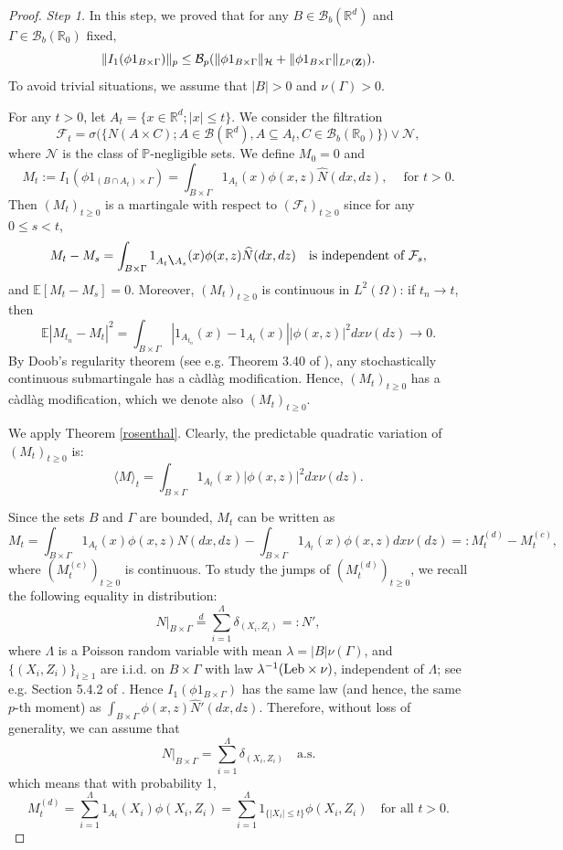 \documentclass[12pt]{article}
\def\cB{\mathcal{B}}
\def\cF{\mathcal{F}}
\def\cH{\mathcal{H}}
\def\cN{\mathcal{N}}
\def\bE{\mathbb{E}}
\def\bP{\mathbb{P}}
\def\bR{\mathbb{R}}
\begin{document}
\begin{proof}
{\em Step 1.} In this step, we proved that for any $B \in \cB_b(\bR^d)$ and $\Gamma \in \cB_b(\bR_0)$ fixed,
\begin{equation}
\label{mom-I2}
\|I_1(\phi 1_{B \times \Gamma})\|_p \leq \cB_p (\|\phi 1_{B \times \Gamma}\|_{\cH}+\|\phi 1_{B \times \Gamma}\|_{L^p({\bf Z})}).
\end{equation}
To avoid trivial situations, we assume that $|B|>0$ and $\nu(\Gamma)>0$.

For any $t>0$, let $A_t=\{x \in \bR^d;|x|\leq t\}$. We consider the filtration
\[
\cF_t=\sigma\big(\big\{N(A \times C); A \in \cB(\bR^d),A \subseteq A_t, C \in \cB_b(\bR_0)\big\}\big) \vee \cN,
\]
where $\cN$ is the class of $\bP$-negligible sets. We define $M_0=0$ and
\[
M_t:=I_1(\phi 1_{(B \cap A_t)\times \Gamma} )=\int_{B \times \Gamma} 1_{A_t}(x)\phi(x,z)\widehat{N}(dx,dz), \quad \ \mbox{for $t>0$}.
\]
Then $(M_t)_{t\geq 0}$ is a martingale with respect to $(\cF_t)_{t\geq 0}$ since for any $0\leq s<t$,
\[
M_t-M_s=\int_{B \times \Gamma} 1_{A_t\verb2\2 A_s}(x)\phi(x,z)\widehat{N}(dx,dz) \quad \mbox{is independent of $\cF_s$},
\]
and $\bE[M_t-M_s]=0$. Moreover, $(M_t)_{t\geq 0}$ is continuous in $L^2(\Omega)$: if $t_n \to t$, then
\[
\bE|M_{t_n}-M_t|^2 =\int_{B \times \Gamma} |1_{A_{t_n}} (x)-1_{A_t}(x)| |\phi(x,z)|^2 dx\nu(dz) \to 0.
\]
By Doob's regularity theorem (see e.g. Theorem 3.40 of \cite{PZ07}), any stochastically continuous submartingale has a c\`adl\`ag modification. Hence, $(M_t)_{t\geq 0}$ has a c\`adl\`ag modification, which we denote also $(M_t)_{t\geq 0}$. 

We apply Theorem \ref{rosenthal}. Clearly, the predictable quadratic variation of $(M_t)_{t\geq 0}$ is:
\[
\langle M\rangle_t=\int_{B \times \Gamma}1_{A_t}(x)|\phi(x,z)|^2 dx \nu(dz).
\]

Since the sets $B$ and $\Gamma$ are bounded, $M_t$ can be written as
\[
M_t=\int_{B \times \Gamma}1_{A_t}(x)\phi(x,z)N(dx,dz)-\int_{B \times \Gamma}1_{A_t}(x)\phi(x,z)dx\nu(dz)=:M_t^{(d)}-M_t^{(c)},
\]
where $(M_t^{(c)})_{t\geq 0}$ is continuous. To study the jumps of $(M_t^{(d)})_{t\geq 0}$, we recall the following equality in distribution:
\[
N|_{B \times \Gamma}\stackrel{d}{=}\sum_{i=1}^{\Lambda}\delta_{(X_i,Z_i)}=:N',
\]
 where $\Lambda$ is a Poisson random variable with mean $\lambda=|B|\nu(\Gamma)$, and $\{(X_i,Z_i)\}_{i\geq 1}$ are i.i.d. on $B \times \Gamma$ with law $\lambda^{-1}({\rm Leb} \times \nu)$, independent of $\Lambda$; see  e.g. Section 5.4.2 of \cite{resnick07}. Hence $I_1(\phi 1_{B \times \Gamma})$ has the same law (and hence, the same $p$-th moment) as $\int_{B \times \Gamma} \phi(x,z) \widehat{N}'(dx,dz)$. Therefore, without loss of generality, we can assume that
 \[
N|_{B \times \Gamma}=\sum_{i=1}^{\Lambda}\delta_{(X_i,Z_i)} \quad \mbox{a.s.}
\]
which means that with probability 1,
\[
M_t^{(d)}=\sum_{i=1}^{\Lambda}1_{A_t}(X_i) \phi(X_i,Z_i) = \sum_{i=1}^{\Lambda}1_{\{|X_i|\leq t\}} \phi(X_i,Z_i) \quad \mbox{for all $t>0$}.
\]


\end{proof}
\end{document}
